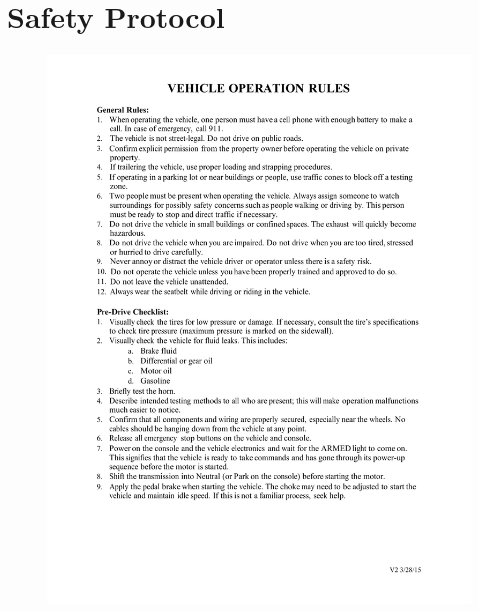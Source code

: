 \appendixpagenumbering
\chapter{Safety Protocol} \label{app:safety}

\begin{figure}[H]
	\centerline{\includegraphics[width=1.0\linewidth]{OperatingSafetyRules_v2.pdf}}
\end{figure}

